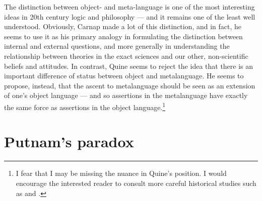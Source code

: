 The distinction between object- and meta-language is one of the most
interesting ideas in 20th century logic and philosophy --- and it
remains one of the least well understood.  Obviously, Carnap made a
lot of this distinction, and in fact, he seems to use it as his
primary analogy in formulating the distinction between internal and
external questions, and more generally in understanding the
relationship between theories in the exact sciences and our other,
non-scientific beliefs and attitudes.  In contrast, Quine seems to
reject the idea that there is an important difference of status
between object and metalanguage.  He seems to propose, instead, that
the ascent to metalanguage should be seen as an extension of one's
object language --- and so assertions in the metalanguage have exactly
the same force as assertions in the object language.\footnote{I fear
  that I may be missing the nuance in Quine's position.  I would
  encourage the interested reader to consult more careful historical
  studies such as \cite[][pp 182ff]{becker} and \cite{hintikka}.}

\section{Putnam's paradox} \label{putnam}

